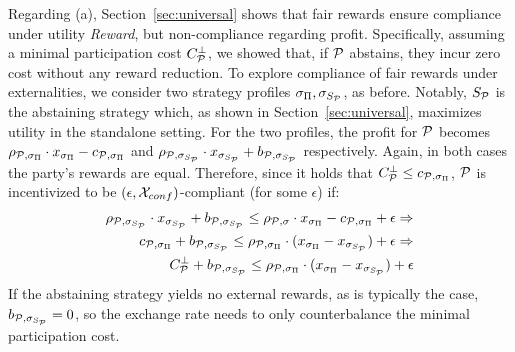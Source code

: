 Regarding (a), Section~\ref{sec:universal} shows that fair rewards ensure
compliance under utility \emph{Reward}, but non-compliance regarding profit.
Specifically, assuming a minimal participation cost $C^\bot_{\mathcal{P}}$, we
showed that, if $\mathcal{P}$ abstains, they incur zero cost without any reward
reduction. To explore compliance of fair rewards under externalities, we
consider two strategy profiles $\sigma_\Pi, \sigma_{S_{\mathcal{P}}}$,
as before. Notably, $S_{\mathcal{P}}$ is the abstaining strategy which, as shown in Section~\ref{sec:universal}, maximizes utility in the standalone setting.
For the two profiles, the profit for $\mathcal{P}$ becomes
$\rho_{\mathcal{P}, \sigma_\Pi} \cdot x_{\sigma_\Pi} - c_{\mathcal{P}, \sigma_\Pi}$ and
$\rho_{\mathcal{P}, \sigma_{S_{\mathcal{P}}}} \cdot x_{\sigma_{S_{\mathcal{P}}}} + b_{\mathcal{P}, \sigma_{S_{\mathcal{P}}}}$ respectively.
Again, in both cases the party's rewards are equal.
Therefore, since it
holds that $C^\bot_{\mathcal{P}} \leq c_{\mathcal{P}, \sigma_\Pi}$,
$\mathcal{P}$ is incentivized to be $(\epsilon, \mathcal{X}_{conf})$-compliant (for some $\epsilon$) if:
\begin{align}
    \rho_{\mathcal{P}, \sigma_{S_{\mathcal{P}}}} \cdot x_{\sigma_{S_{\mathcal{P}}}} + b_{\mathcal{P}, \sigma_{S_{\mathcal{P}}}} \leq \rho_{\mathcal{P}, \sigma} \cdot x_{\sigma_\Pi} - c_{\mathcal{P}, \sigma_\Pi} + \epsilon \Rightarrow \nonumber \\
    c_{\mathcal{P}, \sigma_\Pi} + b_{\mathcal{P}, \sigma_{S_{\mathcal{P}}}} \leq \rho_{\mathcal{P}, \sigma_\Pi} \cdot (x_{\sigma_\Pi} - x_{\sigma_{S_{\mathcal{P}}}}) + \epsilon \Rightarrow \nonumber \\
    C^\bot_{\mathcal{P}} + b_{\mathcal{P}, \sigma_{S_{\mathcal{P}}}} \leq \rho_{\mathcal{P}, \sigma_\Pi} \cdot (x_{\sigma_\Pi} - x_{\sigma_{S_{\mathcal{P}}}}) + \epsilon
\end{align}
If the abstaining strategy yields no external rewards, as is typically the
case, $b_{\mathcal{P}, \sigma_{S_{\mathcal{P}}}} = 0$, so the
exchange rate needs to only counterbalance the minimal participation cost.

